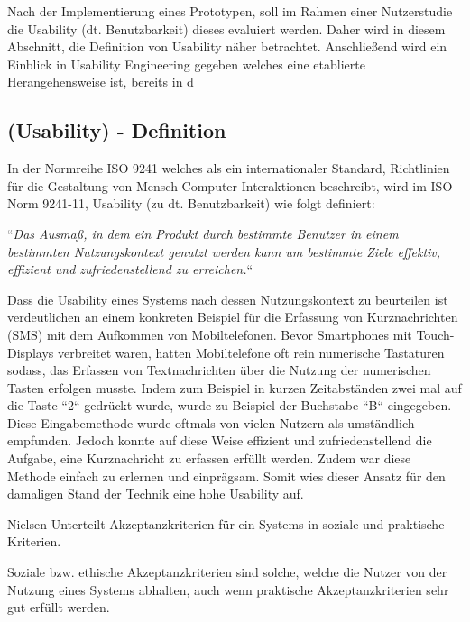 Nach der Implementierung eines Prototypen, soll im Rahmen einer Nutzerstudie die Usability (dt. Benutzbarkeit) dieses evaluiert werden. Daher wird in diesem Abschnitt, die Definition 
von Usability näher betrachtet. Anschließend wird ein Einblick in Usability Engineering gegeben welches eine etablierte Herangehensweise ist, bereits in d 

\subsection{(Usability) - Definition} \label{UsaDef}

In der Normreihe ISO 9241 welches als ein internationaler Standard, Richtlinien für die Gestaltung von Mensch-Computer-Interaktionen beschreibt, wird im ISO Norm 9241-11,  Usability (zu dt. Benutzbarkeit) wie folgt definiert:

``\textit{Das Ausmaß, in dem ein Produkt durch bestimmte Benutzer in einem bestimmten Nutzungskontext genutzt werden kann um bestimmte Ziele effektiv, effizient und zufriedenstellend zu erreichen.}``

Dass die Usability eines Systems nach dessen Nutzungskontext zu beurteilen ist verdeutlichen \cite{MichaelRichter2016} an einem konkreten Beispiel für die Erfassung 
von Kurznachrichten (SMS) mit dem Aufkommen von Mobiltelefonen. Bevor Smartphones mit Touch-Displays verbreitet waren, hatten Mobiltelefone oft rein numerische Tastaturen sodass, das Erfassen 
von Textnachrichten über die Nutzung der numerischen Tasten erfolgen musste. Indem zum Beispiel in kurzen Zeitabständen zwei mal auf die Taste ``2`` gedrückt wurde, wurde zu Beispiel der Buchstabe 
``B`` eingegeben. Diese Eingabemethode wurde oftmals von vielen Nutzern als umständlich empfunden. Jedoch konnte auf diese Weise effizient und zufriedenstellend die Aufgabe, eine Kurznachricht 
zu erfassen erfüllt werden. Zudem war diese Methode einfach zu erlernen und einprägsam. Somit wies dieser Ansatz für den damaligen Stand der Technik eine hohe Usability auf. 

Nielsen \cite{Nielsen1994} Unterteilt Akzeptanzkriterien für ein Systems in soziale und praktische Kriterien.

Soziale bzw. ethische Akzeptanzkriterien sind solche, welche die Nutzer von der Nutzung eines Systems abhalten, auch wenn praktische Akzeptanzkriterien sehr gut erfüllt werden. 


